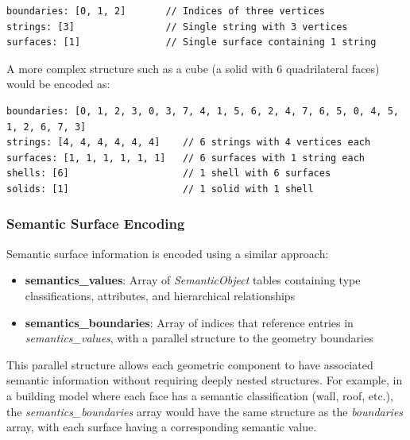 
\begin{lstlisting}[caption={Hierarchical boundary encoding for a simple triangle}, label={lst:triangle_encoding}, basicstyle=\small\ttfamily]
boundaries: [0, 1, 2]       // Indices of three vertices
strings: [3]                // Single string with 3 vertices
surfaces: [1]               // Single surface containing 1 string
\end{lstlisting}

A more complex structure such as a cube (a solid with 6 quadrilateral faces) would be encoded as:

\begin{lstlisting}[caption={Hierarchical boundary encoding for a cube structure}, label={lst:cube_encoding}, basicstyle=\small\ttfamily, breaklines=true]
boundaries: [0, 1, 2, 3, 0, 3, 7, 4, 1, 5, 6, 2, 4, 7, 6, 5, 0, 4, 5, 1, 2, 6, 7, 3]
strings: [4, 4, 4, 4, 4, 4]    // 6 strings with 4 vertices each
surfaces: [1, 1, 1, 1, 1, 1]   // 6 surfaces with 1 string each
shells: [6]                    // 1 shell with 6 surfaces
solids: [1]                    // 1 solid with 1 shell
\end{lstlisting}

\subsubsection{Semantic Surface Encoding}
\label{methodology:feature_encoding:geometry_encoding:semantics}

Semantic surface information is encoded using a similar approach:

\begin{itemize}
  \item \textbf{semantics\_values}: Array of \textit{SemanticObject} tables containing type classifications, attributes, and hierarchical relationships
  \item \textbf{semantics\_boundaries}: Array of indices that reference entries in \textit{semantics\_values}, with a parallel structure to the geometry boundaries
\end{itemize}

This parallel structure allows each geometric component to have associated semantic information without requiring deeply nested structures. For example, in a building model where each face has a semantic classification (wall, roof, etc.), the \textit{semantics\_boundaries} array would have the same structure as the \textit{boundaries} array, with each surface having a corresponding semantic value.

